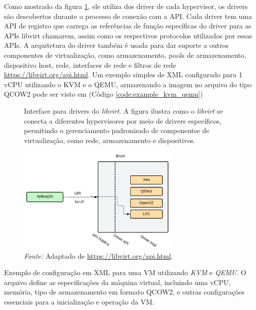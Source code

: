 Como mostrado da figura \ref*{fig:libvirt_interface}, ele utiliza dos driver de cada hypervisor, os drivers são descobertos durante o processo de conexão com a API. Cada driver tem uma API de registro que carrega as referências de função específicas do driver para as APIs libvirt chamarem, assim como os respectivos protocolos utilizados por essas APIs. A arquitetura do driver também é usada para dar suporte a outros componentes de virtualização, como armazenamento, pools de armazenamento, dispositivo host, rede, interfaces de rede e filtros de rede \url{https://libvirt.org/api.html}. Um exemplo simples de XML configurado para 1 vCPU utilizando o KVM e o QEMU, armazenando a imagem no arquivo do tipo QCOW2 pode ser visto em (Código \ref{code:example_kvm_qemu})


\begin{figure}[htbp]
  \centering
  \caption{Interface para drivers do \textit{libvirt}. A figura ilustra como o \textit{libvirt} se conecta a diferentes hypervisores por meio de drivers específicos, permitindo o gerenciamento padronizado de componentes de virtualização, como rede, armazenamento e dispositivos.}
  \includegraphics[width=0.7\textwidth]{images/libvirt_interface.png}
  \caption*{\textit{Fonte:} Adaptado de \url{https://libvirt.org/api.html}.}
  \label{fig:libvirt_interface}
\end{figure}

\begin{listing}[h!]
  \noindent{}  
\caption{Exemplo de configuração em XML para uma VM utilizando \textit{KVM} e \textit{QEMU}. O arquivo define as especificações da máquina virtual, incluindo uma vCPU, memória, tipo de armazenamento em formato QCOW2, e outras configurações essenciais para a inicialização e operação da VM.}
\label{code:example_kvm_qemu}
\end{listing}


